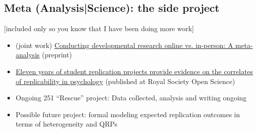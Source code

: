 \documentclass[]{article}
\begin{document}
\subsection*{Meta (Analysis|Science): the side project}
[included only so you know that I have been doing more work]
\begin{itemize}
	\item (joint work) \href{https://osf.io/preprints/psyarxiv/qc6fw}{Conducting developmental research online vs. in-person: A meta-analysis} (preprint)
	\item \href{https://royalsocietypublishing.org/doi/full/10.1098/rsos.231240}{Eleven years of student replication projects provide evidence on the correlates of replicability in psychology} (published at Royal Society Open Science)
	\item  Ongoing 251 ``Rescue'' project: Data collected, analysis and writing ongoing
	\item Possible future project: formal modeling expected replication outcomes in terms of heterogeneity and QRPs
\end{itemize}
%
%
%
\end{document}
